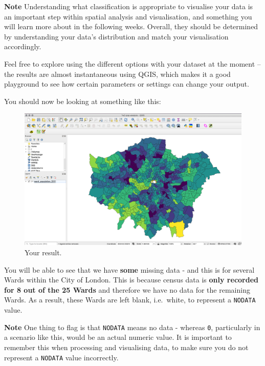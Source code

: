 \documentclass[
]{book}
\begin{document}
\textbf{Note}
Understanding what classification is appropriate to visualise your data is an important step within spatial analysis and visualisation, and something you will learn more about in the following weeks. Overall, they should be determined by understanding your data's distribution and match your visualisation accordingly.

Feel free to explore using the different options with your dataset at the moment -- the results are almost instantaneous using QGIS, which makes it a good playground to see how certain parameters or settings can change your output.

You should now be looking at something like this:

\begin{figure}

{\centering \includegraphics[width=39.89in]{images/w02/ward_2011} 

}

\caption{Your result.}\label{fig:02-ward-result}
\end{figure}

You will be able to see that we have \textbf{some} missing data - and this is for several Wards within the City of London. This is because census data is \textbf{only recorded for 8 out of the 25 Wards} and therefore we have no data for the remaining Wards. As a result, these Wards are left blank, i.e.~white, to represent a \texttt{NODATA} value.

\textbf{Note}
One thing to flag is that \texttt{NODATA} means no data - whereas \texttt{0}, particularly in a scenario like this, would be an actual numeric value. It is important to remember this when processing and visualising data, to make sure you do not represent a \texttt{NODATA} value incorrectly.
\end{document}
